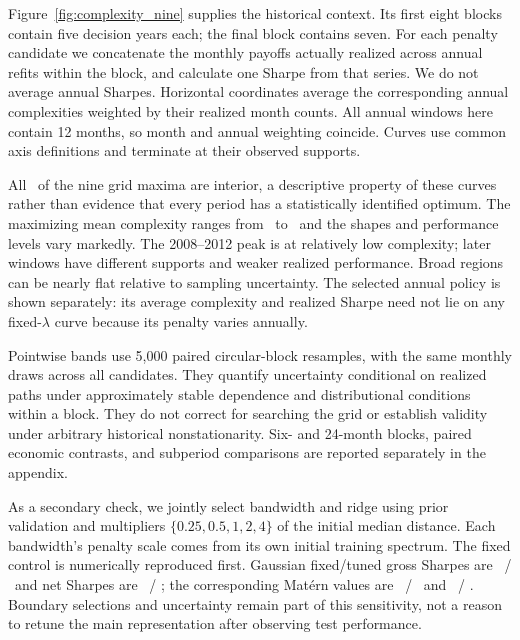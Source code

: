Figure~\ref{fig:complexity_nine} supplies the historical context. Its first
eight blocks contain five decision years each; the final block contains seven.
For each penalty candidate we concatenate the monthly payoffs actually realized
across annual refits within the block, and calculate one Sharpe from that
series. We do not average annual Sharpes. Horizontal coordinates average the
corresponding annual complexities weighted by their realized month counts.
All annual windows here contain 12 months, so month and annual weighting
coincide. Curves use common axis definitions and terminate at their observed
supports.

All \InteriorCount\ of the nine grid maxima are interior, a descriptive
property of these curves rather than evidence that every period has a
statistically identified optimum. The maximizing mean complexity ranges
from \MinimumPeakC\ to \MaximumPeakC\, and the shapes and performance levels
vary markedly. The 2008--2012 peak is at relatively low complexity; later
windows have different supports and weaker realized performance. Broad
regions can be nearly flat relative to sampling uncertainty. The selected
annual policy is shown separately: its average complexity and realized Sharpe
need not lie on any fixed-$\lambda$ curve because its penalty varies annually.

Pointwise bands use 5,000 paired circular-block resamples, with the same
monthly draws across all candidates. They quantify uncertainty conditional
on realized paths under approximately stable dependence and distributional
conditions within a block. They do not correct for searching the grid or
establish validity under arbitrary historical nonstationarity. Six- and
24-month blocks, paired economic contrasts, and subperiod comparisons are
reported separately in the appendix.

As a secondary check, we jointly select bandwidth and ridge using prior
validation and multipliers $\{0.25,0.5,1,2,4\}$ of the initial median distance.
Each bandwidth's penalty scale comes from its own initial training spectrum.
The fixed control is numerically reproduced first. Gaussian fixed/tuned gross
Sharpes are \GaussianFixed\ / \GaussianTuned\ and net Sharpes are
\GaussianFixedNet\ / \GaussianTunedNet; the corresponding Mat\'ern values are
\MaternFixed\ / \MaternTuned\ and \MaternFixedNet\ / \MaternTunedNet.
Boundary selections and uncertainty remain part of this sensitivity, not a
reason to retune the main representation after observing test performance.

